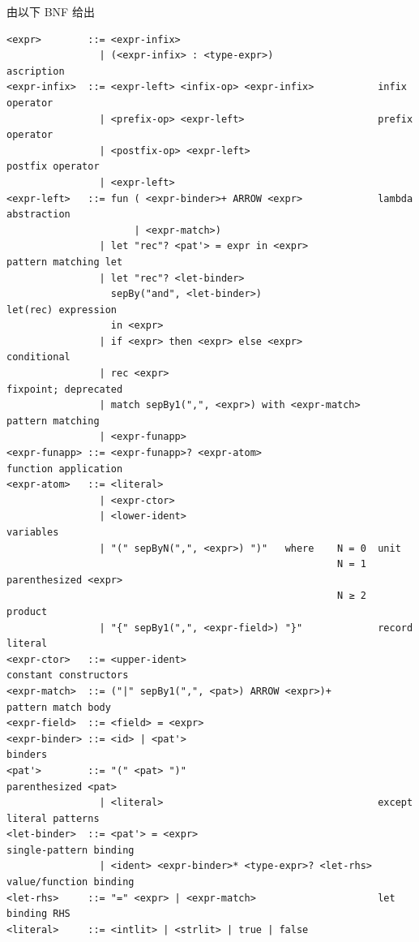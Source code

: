 \begin{definition}[表达式] 由以下 BNF 给出
\begin{verbatim}
<expr>        ::= <expr-infix>
                | (<expr-infix> : <type-expr>)                  ascription
<expr-infix>  ::= <expr-left> <infix-op> <expr-infix>           infix operator
                | <prefix-op> <expr-left>                       prefix operator
                | <postfix-op> <expr-left>                      postfix operator
                | <expr-left>
<expr-left>   ::= fun ( <expr-binder>+ ARROW <expr>             lambda abstraction
                      | <expr-match>)
                | let "rec"? <pat'> = expr in <expr>            pattern matching let
                | let "rec"? <let-binder>
                  sepBy("and", <let-binder>)                    let(rec) expression
                  in <expr>
                | if <expr> then <expr> else <expr>             conditional
                | rec <expr>                                    fixpoint; deprecated
                | match sepBy1(",", <expr>) with <expr-match>   pattern matching
                | <expr-funapp>
<expr-funapp> ::= <expr-funapp>? <expr-atom>                    function application
<expr-atom>   ::= <literal>
                | <expr-ctor>
                | <lower-ident>                                 variables
                | "(" sepByN(",", <expr>) ")"   where    N = 0  unit
                                                         N = 1  parenthesized <expr>
                                                         N ≥ 2  product
                | "{" sepBy1(",", <expr-field>) "}"             record literal
<expr-ctor>   ::= <upper-ident>                                 constant constructors
<expr-match>  ::= ("|" sepBy1(",", <pat>) ARROW <expr>)+        pattern match body
<expr-field>  ::= <field> = <expr>
<expr-binder> ::= <id> | <pat'>                                 binders
<pat'>        ::= "(" <pat> ")"                                 parenthesized <pat>
                | <literal>                                     except literal patterns
<let-binder>  ::= <pat'> = <expr>                               single-pattern binding
                | <ident> <expr-binder>* <type-expr>? <let-rhs> value/function binding
<let-rhs>     ::= "=" <expr> | <expr-match>                     let binding RHS
<literal>     ::= <intlit> | <strlit> | true | false
\end{verbatim}
\end{definition}
